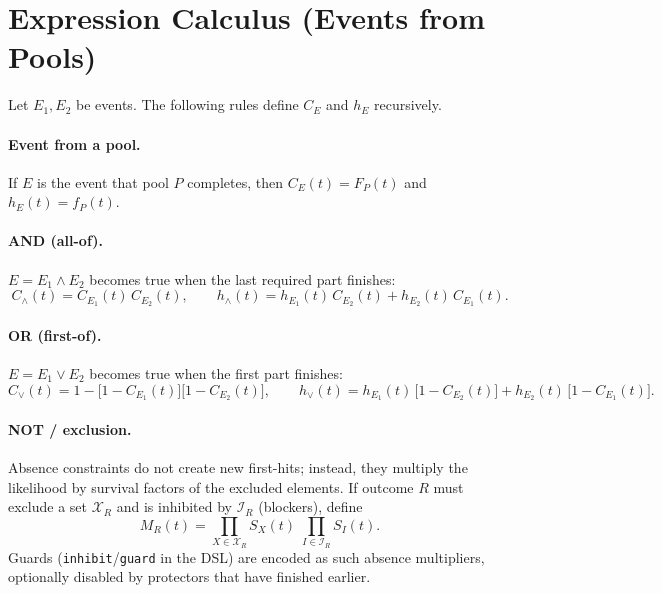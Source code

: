 \documentclass[11pt]{article}
\begin{document}
\section{Expression Calculus (Events from Pools)}
Let $E_1,E_2$ be events. The following rules define $C_E$ and $h_E$ recursively.
\paragraph{Event from a pool.} If $E$ is the event that pool $P$ completes, then $C_E(t)=F_P(t)$ and $h_E(t)=f_P(t)$.
\paragraph{AND (all-of).} $E=E_1\land E_2$ becomes true when the last required part finishes:
\begin{equation}
  C_{\land}(t) = C_{E_1}(t)\,C_{E_2}(t),\qquad
  h_{\land}(t) = h_{E_1}(t)\,C_{E_2}(t) + h_{E_2}(t)\,C_{E_1}(t).\label{eq:and}
\end{equation}
\paragraph{OR (first-of).} $E=E_1\lor E_2$ becomes true when the first part finishes:
\begin{equation}
  C_{\lor}(t) = 1 - \bigl[1-C_{E_1}(t)\bigr]\bigl[1-C_{E_2}(t)\bigr],\qquad
  h_{\lor}(t) = h_{E_1}(t)\,\bigl[1-C_{E_2}(t)\bigr] + h_{E_2}(t)\,\bigl[1-C_{E_1}(t)\bigr].\label{eq:or}
\end{equation}
\paragraph{NOT / exclusion.} Absence constraints do not create new first-hits; instead, they multiply the likelihood by survival factors of the excluded elements. If outcome $R$ must exclude a set $\mathcal{X}_R$ and is inhibited by $\mathcal{I}_R$ (blockers), define
\begin{equation}
  M_R(t) = \prod_{X\in\mathcal{X}_R} S_X(t)\; \prod_{I\in\mathcal{I}_R} S_I(t).\label{eq:absence}
\end{equation}
Guards (\texttt{inhibit}/\texttt{guard} in the DSL) are encoded as such absence multipliers, optionally disabled by protectors that have finished earlier.
\end{document}
